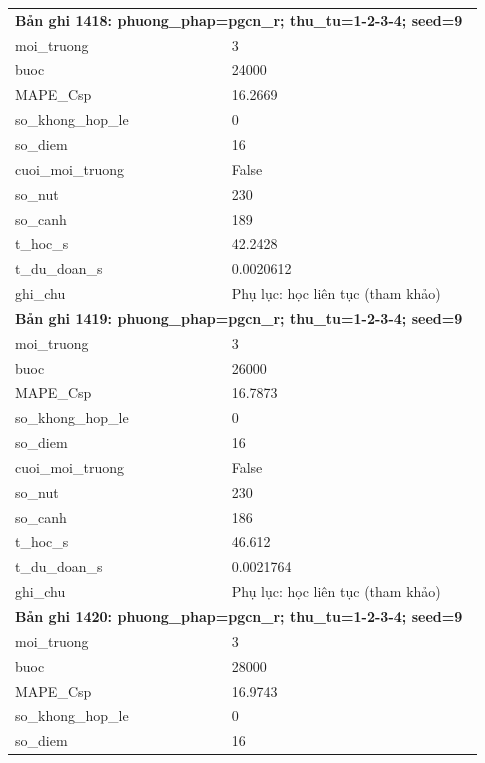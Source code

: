\begin{longtable}{p{0.43\linewidth}p{0.50\linewidth}}
\midrule
\multicolumn{2}{p{0.95\linewidth}}{\textbf{Bản ghi 1418: phuong\_phap=pgcn\_r; thu\_tu=1-2-3-4; seed=9}} \\
moi\_\allowbreak truong & 3 \\
buoc & 24000 \\
MAPE\_\allowbreak Csp & 16.2669 \\
so\_\allowbreak khong\_\allowbreak hop\_\allowbreak le & 0 \\
so\_\allowbreak diem & 16 \\
cuoi\_\allowbreak moi\_\allowbreak truong & False \\
so\_\allowbreak nut & 230 \\
so\_\allowbreak canh & 189 \\
t\_\allowbreak hoc\_\allowbreak s & 42.2428 \\
t\_\allowbreak du\_\allowbreak doan\_\allowbreak s & 0.0020612 \\
ghi\_\allowbreak chu & Phụ lục: học liên tục (tham khảo) \\
\midrule
\multicolumn{2}{p{0.95\linewidth}}{\textbf{Bản ghi 1419: phuong\_phap=pgcn\_r; thu\_tu=1-2-3-4; seed=9}} \\
moi\_\allowbreak truong & 3 \\
buoc & 26000 \\
MAPE\_\allowbreak Csp & 16.7873 \\
so\_\allowbreak khong\_\allowbreak hop\_\allowbreak le & 0 \\
so\_\allowbreak diem & 16 \\
cuoi\_\allowbreak moi\_\allowbreak truong & False \\
so\_\allowbreak nut & 230 \\
so\_\allowbreak canh & 186 \\
t\_\allowbreak hoc\_\allowbreak s & 46.612 \\
t\_\allowbreak du\_\allowbreak doan\_\allowbreak s & 0.0021764 \\
ghi\_\allowbreak chu & Phụ lục: học liên tục (tham khảo) \\
\midrule
\multicolumn{2}{p{0.95\linewidth}}{\textbf{Bản ghi 1420: phuong\_phap=pgcn\_r; thu\_tu=1-2-3-4; seed=9}} \\
moi\_\allowbreak truong & 3 \\
buoc & 28000 \\
MAPE\_\allowbreak Csp & 16.9743 \\
so\_\allowbreak khong\_\allowbreak hop\_\allowbreak le & 0 \\
so\_\allowbreak diem & 16 \\

\end{longtable}

